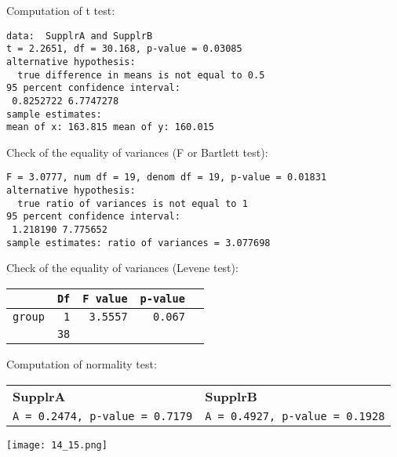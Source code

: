 \begin{frame}[fragile]
  Computation of t test:
  \begin{verbatim}
data:  SupplrA and SupplrB
t = 2.2651, df = 30.168, p-value = 0.03085
alternative hypothesis:
  true difference in means is not equal to 0.5
95 percent confidence interval:
 0.8252722 6.7747278
sample estimates:
mean of x: 163.815 mean of y: 160.015 
  \end{verbatim}
\end{frame}

\begin{frame}[fragile]
  Check of the equality of variances (F or Bartlett test):
  \begin{verbatim}
F = 3.0777, num df = 19, denom df = 19, p-value = 0.01831
alternative hypothesis: 
  true ratio of variances is not equal to 1 
95 percent confidence interval:
 1.218190 7.775652 
sample estimates: ratio of variances = 3.077698 
  \end{verbatim}
  \vspace{.2cm}
  Check of the equality of variances (Levene test):\\
  \begin{tabular}{l|rrrr}
    \hline
    & \texttt{Df} & \texttt{F value} & \texttt{p-value} \\
    \hline
    \texttt{group} & \texttt{1} & \texttt{3.5557} & \texttt{0.067} \\
    & \texttt{38} & & & \\
    \hline
  \end{tabular} 
\end{frame}

\begin{frame}
  Computation of normality test:\\
  \vspace{.3cm}
  \begin{scriptsize}
    \begin{tabular}{ll}
      \textbf{SupplrA} & \textbf{SupplrB}\\
      \texttt{A = 0.2474, p-value = 0.7179} & \texttt{A = 0.4927, p-value = 0.1928}\\
    \end{tabular} 
  \end{scriptsize}
  \begin{center}
  \texttt{[image: 14\_15.png]}
  \end{center}
\end{frame}

